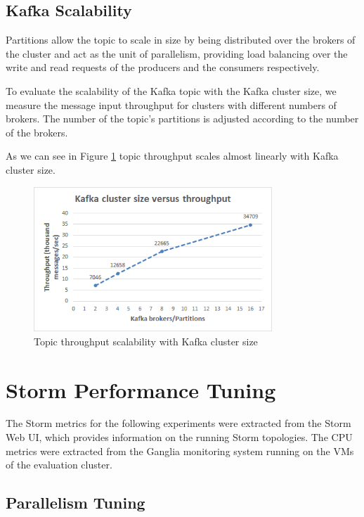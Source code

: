 \subsection{Kafka Scalability}

Partitions allow the topic to scale in size by being distributed over the brokers of the cluster and act as the unit of parallelism, providing load balancing over the write and read requests of the producers and the consumers respectively.

To evaluate the scalability of the Kafka topic with the Kafka cluster size, we measure the message input throughput for clusters with different numbers of brokers. The number of the topic's partitions is adjusted according to the number of the brokers.

As we can see in Figure \ref{figure:benchmarks_kafka_scalability} topic throughput scales almost linearly with Kafka cluster size.

\begin{figure}[H]
\centering
\includegraphics[width=0.8\textwidth]{figures/benchmarks_kafka_scalability}
\caption{Topic throughput scalability with Kafka cluster size}
\label{figure:benchmarks_kafka_scalability}
\end{figure}


\section{Storm Performance Tuning}

The Storm metrics for the following experiments were extracted from the Storm Web UI, which provides information on the running Storm topologies. The CPU metrics were extracted from the Ganglia monitoring system \cite{ganglia} running on the VMs of the evaluation cluster.

\subsection{Parallelism Tuning}\label{subsection:benchmarks_storm_tuning}

